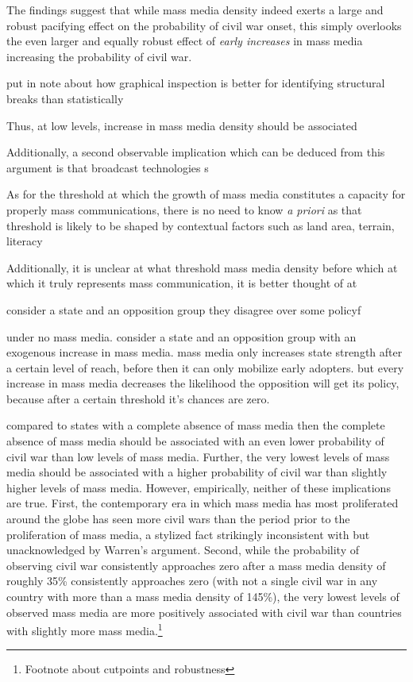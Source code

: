 \documentclass[11pt,article,oneside]{memoir}
\begin{document}
The findings suggest that while mass media density indeed exerts a large
and robust pacifying effect on the probability of civil war onset, this
simply overlooks the even larger and equally robust effect of
\emph{early increases} in mass media increasing the probability of civil
war.

put in note about how graphical inspection is better for identifying
structural breaks than statistically

Thus, at low levels, increase in mass media density should be associated

Additionally, a second observable implication which can be deduced from
this argument is that broadcast technologies s

As for the threshold at which the growth of mass media constitutes a
capacity for properly mass communications, there is no need to know
\emph{a priori} as that threshold is likely to be shaped by contextual
factors such as land area, terrain, literacy

Additionally, it is unclear at what threshold mass media density before
which at which it truly represents mass communication, it is better
thought of at

consider a state and an opposition group they disagree over some policyf

under no mass media. consider a state and an opposition group with an
exogenous increase in mass media. mass media only increases state
strength after a certain level of reach, before then it can only
mobilize early adopters. but every increase in mass media decreases the
likelihood the opposition will get its policy, because after a certain
threshold it's chances are zero.

compared to states with a complete absence of mass media then the
complete absence of mass media should be associated with an even lower
probability of civil war than low levels of mass media. Further, the
very lowest levels of mass media should be associated with a higher
probability of civil war than slightly higher levels of mass media.
However, empirically, neither of these implications are true. First, the
contemporary era in which mass media has most proliferated around the
globe has seen more civil wars than the period prior to the
proliferation of mass media, a stylized fact strikingly inconsistent
with but unacknowledged by Warren's argument. Second, while the
probability of observing civil war consistently approaches zero after a
mass media density of roughly 35\% consistently approaches zero (with
not a single civil war in any country with more than a mass media
density of 145\%), the very lowest levels of observed mass media are
more positively associated with civil war than countries with slightly
more mass media.\footnote{Footnote about cutpoints and robustness}
\end{document}
